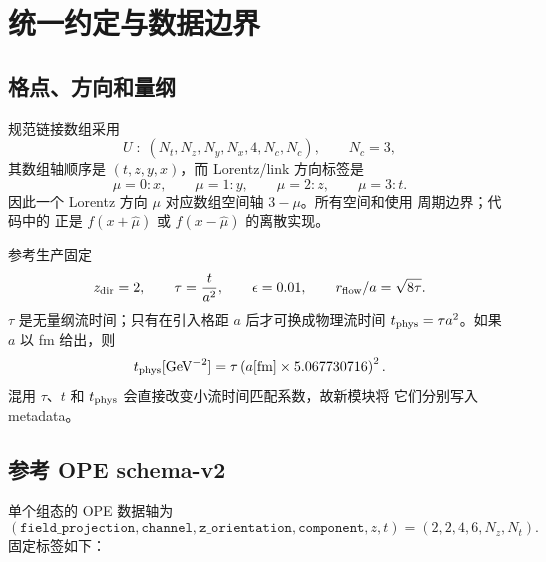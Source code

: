 \documentclass[UTF8,a4paper,11pt]{ctexart}
\newcommand{\code}[1]{\texttt{\detokenize{#1}}}
\begin{document}
\section{统一约定与数据边界}

\subsection{格点、方向和量纲}

规范链接数组采用
\begin{equation}
 U\;:\;(N_t,N_z,N_y,N_x,4,N_c,N_c),
\qquad N_c=3,
\label{eq:gauge-layout}
\end{equation}
其数组轴顺序是 $(t,z,y,x)$，而 Lorentz/link 方向标签是
\[
\mu=0:x,\qquad \mu=1:y,\qquad \mu=2:z,\qquad \mu=3:t.
\]
因此一个 Lorentz 方向 $\mu$ 对应数组空间轴 $3-\mu$。所有空间和使用
周期边界；代码中的 \code{roll} 正是
$f(x+\hat\mu)$ 或 $f(x-\hat\mu)$ 的离散实现。

参考生产固定
\begin{equation}
 z_{\rm dir}=2,\qquad
 \tau=\frac{t}{a^2},\qquad
 \epsilon=0.01,\qquad
 r_{\rm flow}/a=\sqrt{8\tau}.
\label{eq:flow-units}
\end{equation}
$\tau$ 是无量纲流时间；只有在引入格距 $a$ 后才可换成物理流时间
$t_{\rm phys}=\tau a^2$。如果 $a$ 以 fm 给出，则
\begin{equation}
 t_{\rm phys}[{\rm GeV}^{-2}]
 =\tau\left(a[{\rm fm}]\times 5.067730716\right)^2.
\label{eq:flow-convert}
\end{equation}
混用 $\tau$、$t$ 和 $t_{\rm phys}$ 会直接改变小流时间匹配系数，故新模块将
它们分别写入 metadata。

\subsection{参考 OPE schema-v2}

单个组态的 OPE 数据轴为
\begin{equation}
(\texttt{field\_projection},\texttt{channel},\texttt{z\_orientation},
\texttt{component},z,t)
=(2,2,4,6,N_z,N_t).
\label{eq:ope-shape}
\end{equation}
固定标签如下：
\end{document}
